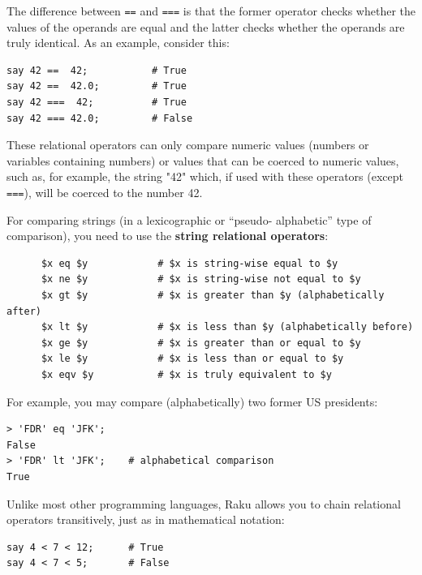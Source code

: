 The difference between {\tt ==} and {\tt ===} is that the 
former operator checks whether the values of the operands 
are equal and the latter checks whether the operands are 
truly identical. As an example, consider this:

\begin{verbatim}
say 42 ==  42;           # True
say 42 ==  42.0;         # True
say 42 ===  42;          # True
say 42 === 42.0;         # False
\end{verbatim}
%


These relational operators can only compare numeric values
(numbers or variables containing numbers) or values that 
can be coerced to numeric values, such as, for example, 
the string "42" which, if used with these operators 
(except {\tt ===}), will be coerced to the number 42.

For comparing strings (in a lexicographic or ``pseudo-
alphabetic'' type of comparison), you need to use 
the {\bf string relational operators}:

\begin{verbatim}
      $x eq $y            # $x is string-wise equal to $y
      $x ne $y            # $x is string-wise not equal to $y
      $x gt $y            # $x is greater than $y (alphabetically after)
      $x lt $y            # $x is less than $y (alphabetically before)
      $x ge $y            # $x is greater than or equal to $y
      $x le $y            # $x is less than or equal to $y
      $x eqv $y           # $x is truly equivalent to $y
\end{verbatim}
%  



For example, you may compare (alphabetically) two former 
US presidents:
\begin{verbatim}
> 'FDR' eq 'JFK';
False
> 'FDR' lt 'JFK';    # alphabetical comparison
True
\end{verbatim}
%  

Unlike most other programming languages, Raku allows you to chain relational operators transitively, just as in mathematical notation:

\begin{verbatim}
say 4 < 7 < 12;      # True
say 4 < 7 < 5;       # False
\end{verbatim}

